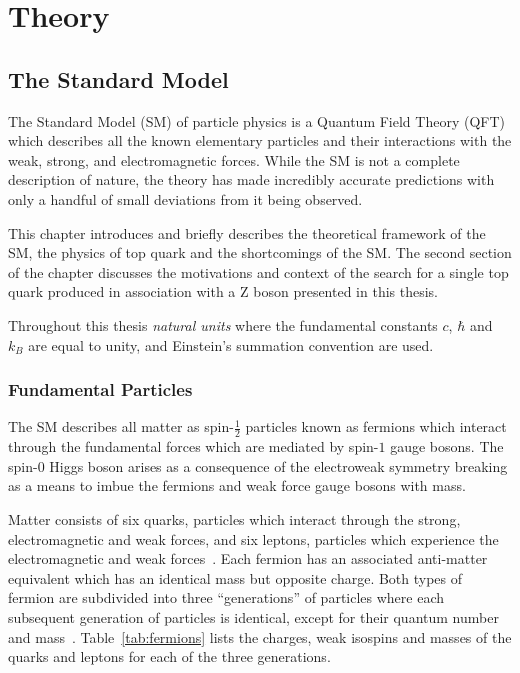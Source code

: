 \chapter{Theory}\label{chapter:theory}
\section{The Standard Model}\label{sec:sm}
The Standard Model (SM) of particle physics is a Quantum Field Theory (QFT) which describes all the known elementary particles and their interactions with the weak, strong, and electromagnetic forces.
While the SM is not a complete description of nature, the theory has made incredibly accurate predictions with only a handful of small deviations from it being observed.

This chapter introduces and briefly describes the theoretical framework of the SM, the physics of top quark and the shortcomings of the SM.
The second section of the chapter discusses the motivations and context of the search for a single top quark produced in association with a Z boson presented in this thesis.

Throughout this thesis \emph{natural units} where the fundamental constants $c$, $\hbar$ and $k_{B}$ are equal to unity, and Einstein's summation convention are used.

\subsection{Fundamental Particles}\label{subsec:particles}
The SM describes all matter as spin-$\frac{1}{2}$ particles known as fermions which interact through the fundamental forces which are mediated by spin-$1$ gauge bosons.
The spin-$0$ Higgs boson arises as a consequence of the electroweak symmetry breaking as a means to imbue the fermions and weak force gauge bosons with mass.

Matter consists of six quarks, particles which interact through the strong, electromagnetic and weak forces, and six leptons, particles which experience the electromagnetic and weak forces~\cite{LagrangiansSM}.
Each fermion has an associated anti-matter equivalent which has an identical mass but opposite charge.
Both types of fermion are subdivided into three ``generations'' of particles where each subsequent generation of particles is identical, except for their quantum number and mass~\cite{ElectroweakStrong}.
Table~\ref{tab:fermions} lists the charges, weak isospins and masses of the quarks and leptons for each of the three generations.

